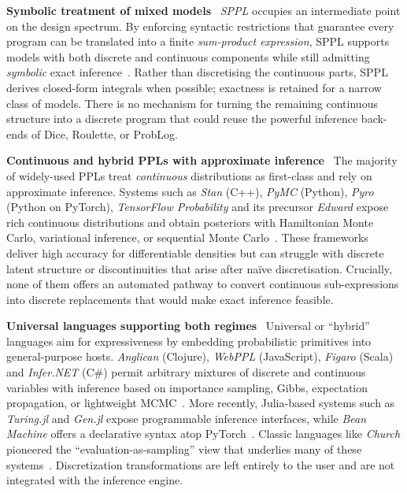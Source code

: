 \documentclass[acmsmall,screen,dvipsnames,x11names,nonacm,anonymous,review]{acmart}
\renewcommand{\paragraph}[1]{\vspace{1em}\noindent\textbf{#1}\ }
\begin{document}
\paragraph{Symbolic treatment of mixed models}  
\emph{SPPL} occupies an intermediate point on the design spectrum. By enforcing syntactic restrictions that guarantee every program can be translated into a finite \emph{sum-product expression}, SPPL supports models with both discrete and continuous components while still admitting \emph{symbolic} exact inference~\cite{Saad2021SPPL}. Rather than discretising the continuous parts, SPPL derives closed-form integrals when possible; exactness is retained for a narrow class of models. There is no mechanism for turning the remaining continuous structure into a discrete program that could reuse the powerful inference back-ends of Dice, Roulette, or ProbLog.

\paragraph{Continuous and hybrid PPLs with approximate inference}  
The majority of widely-used PPLs treat \emph{continuous} distributions as first-class and rely on approximate inference. Systems such as \emph{Stan} (C++), \emph{PyMC} (Python), \emph{Pyro} (Python on PyTorch), \emph{TensorFlow Probability} and its precursor \emph{Edward} expose rich continuous distributions and obtain posteriors with Hamiltonian Monte Carlo, variational inference, or sequential Monte Carlo~\cite{Carpenter2017Stan,Salvatier2016PyMC3,Bingham2019Pyro,Dillon2017TFP,Tran2016Edward}. These frameworks deliver high accuracy for differentiable densities but can struggle with discrete latent structure or discontinuities that arise after naïve discretisation. Crucially, none of them offers an automated pathway to convert continuous sub-expressions into discrete replacements that would make exact inference feasible.

\paragraph{Universal languages supporting both regimes}  
Universal or ``hybrid'' languages aim for expressiveness by embedding probabilistic primitives into general-purpose hosts. \emph{Anglican} (Clojure), \emph{WebPPL} (JavaScript), \emph{Figaro} (Scala) and \emph{Infer.NET} (C\#) permit arbitrary mixtures of discrete and continuous variables with inference based on importance sampling, Gibbs, expectation propagation, or lightweight MCMC~\cite{Tolpin2016Anglican,Goodman2014WebPPL,Pfeffer2009Figaro,Minka2018InferNET}. More recently, Julia-based systems such as \emph{Turing.jl} and \emph{Gen.jl} expose programmable inference interfaces, while \emph{Bean Machine} offers a declarative syntax atop PyTorch~\cite{Ge2018Turing,CusumanoTowner2019Gen,Tehrani2020BeanMachine}. Classic languages like \emph{Church} pioneered the ``evaluation-as-sampling'' view that underlies many of these systems~\cite{Goodman2008Church}. Discretization transformations are left entirely to the user and are not integrated with the inference engine.
\end{document}
